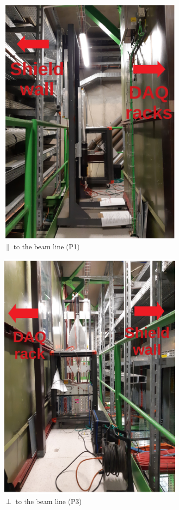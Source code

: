 \newpage
\begin{figure}[h]
    \centering
    \begin{subfigure}{}
        \centering
        \includegraphics[width=0.5\columnwidth]{figs/INT/Initial.pdf} 
        \caption{$\parallel$ to the beam line (P1)}
        \label{fig:sub1}
    \end{subfigure}
    \begin{subfigure}{}
        \centering
        \includegraphics[width=0.5\columnwidth]{figs/INT/Back_central.pdf}
        \caption{$\perp$ to the beam line (P3)}
        \label{fig:sub2}
    \end{subfigure}
    \begin{subfigure}{}
        \centering

\end{subfigure}
\end{figure}
